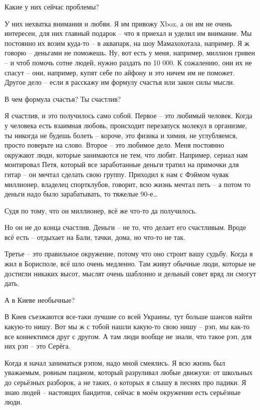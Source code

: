 Какие у них сейчас проблемы?

У них нехватка внимания и любви. Я им привожу Xbox, а он им не очень интересен,
для них главный подарок – что я приехал и уделил им внимание. Мы постоянно их
возим куда-то – в аквапарк, на шоу Мамахохотала, например. Я ж говорю –
деньгами не поможешь. Ну, вот есть у меня, например, миллион гривен – и чтоб
помочь сотне людей, нужно раздать по 10 000. К сожалению, они их не спасут –
они, например, купят себе по айфону и это ничем им не поможет. Другое дело –
если я расскажу им формулу счастья или закон силы мысли.

В чем формула счастья? Ты счастлив?

Я счастлив, и это получилось само собой. Первое – это любимый человек. Когда у
человека есть взаимная любовь, происходит перезапуск молекул в организме, ты
никогда не будешь болеть – короче, это физика и химия, не углубляемся, просто
поверьте на слово. Второе – это любимое дело. Меня постоянно окружают люди,
которые занимаются не тем, что любят. Например, сериал нам монтировал Петя,
который все заработанные деньги тратил на примочки для гитар – он мечтал
сделать свою группу. Приходил к нам с Фэймом чувак миллионер, владелец
спортклубов, говорит, всю жизнь мечтал петь – а потом то деньги надо было
зарабатывать, то тяжелые 90-е…

Судя по тому, что он миллионер, всё же что-то да получилось.

Но он не до конца счастлив. Деньги – не то, что делает его счастливым. Вроде
всё есть – отдыхает на Бали, тачки, дома, но что-то не так.

Третье – это правильное окружение, потому что оно строит вашу судьбу. Когда я
жил в Борисполе, всё шло очень медленно. Там живут обычные люди, которые не
достигли никаких высот, мыслят очень шаблонно и дельный совет вряд ли смогут
дать.

А в Киеве необычные?

В Киев съезжаются все-таки лучшие со всей Украины, тут больше шансов найти
какую-то нишу. Вот мы ж с тобой нашли какую-то свою нишу – рэп, мы как-то все
коннектимся друг с другом. А там люди вообще не знали, что такое рэп, для них
рэп – это Серёга.

Когда я начал заниматься рэпом, надо мной смеялись. Я всю жизнь был уважаемым,
ровным пацаном, который разруливал любые движухи: от школьных до серьёзных
разборок, а не таких, о которых я слышу в песнях про падики. Я знаю людей –
настоящих бандитов, сейчас в моём окружении есть серьёзные люди.

